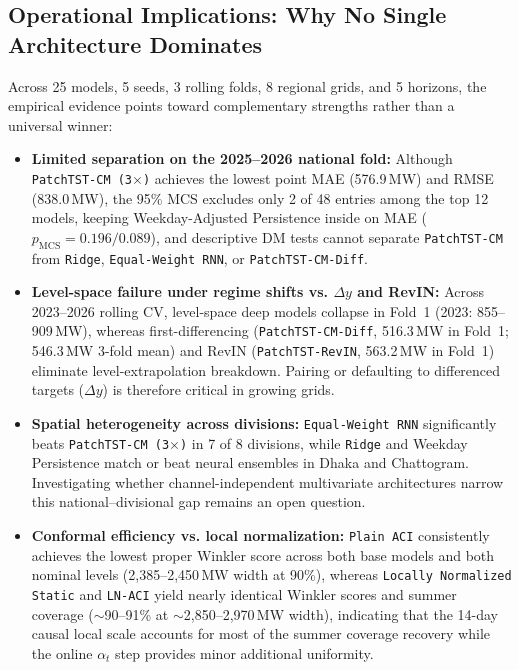 \documentclass[5p,twocolumn,authoryear]{elsarticle}
\begin{document}
\subsection{Operational Implications: Why No Single Architecture Dominates}
Across 25 models, 5 seeds, 3 rolling folds, 8 regional grids, and 5 horizons, the empirical evidence points toward complementary strengths rather than a universal winner:
\begin{itemize}
    \item \textbf{Limited separation on the 2025--2026 national fold:} Although \texttt{PatchTST-CM (3$\times$)} achieves the lowest point MAE (576.9\,MW) and RMSE (838.0\,MW), the 95\% MCS excludes only 2 of 48 entries among the top 12 models, keeping Weekday-Adjusted Persistence inside on MAE ($p_{\text{MCS}} = 0.196 / 0.089$), and descriptive DM tests cannot separate \texttt{PatchTST-CM} from \texttt{Ridge}, \texttt{Equal-Weight RNN}, or \texttt{PatchTST-CM-Diff}.
    \item \textbf{Level-space failure under regime shifts vs. $\Delta y$ and RevIN:} Across 2023--2026 rolling CV, level-space deep models collapse in Fold~1 (2023: 855--909\,MW), whereas first-differencing (\texttt{PatchTST-CM-Diff}, 516.3\,MW in Fold~1; 546.3\,MW 3-fold mean) and RevIN (\texttt{PatchTST-RevIN}, 563.2\,MW in Fold~1) eliminate level-extrapolation breakdown. Pairing or defaulting to differenced targets ($\Delta y$) is therefore critical in growing grids.
    \item \textbf{Spatial heterogeneity across divisions:} \texttt{Equal-Weight RNN} significantly beats \texttt{PatchTST-CM (3$\times$)} in 7 of 8 divisions, while \texttt{Ridge} and Weekday Persistence match or beat neural ensembles in Dhaka and Chattogram. Investigating whether channel-independent multivariate architectures narrow this national--divisional gap remains an open question.
    \item \textbf{Conformal efficiency vs. local normalization:} \texttt{Plain ACI} consistently achieves the lowest proper Winkler score across both base models and both nominal levels (2,385--2,450\,MW width at 90\%), whereas \texttt{Locally Normalized Static} and \texttt{LN-ACI} yield nearly identical Winkler scores and summer coverage ($\sim$90--91\% at $\sim$2,850--2,970\,MW width), indicating that the 14-day causal local scale accounts for most of the summer coverage recovery while the online $\alpha_t$ step provides minor additional uniformity.
\end{itemize}
\end{document}
